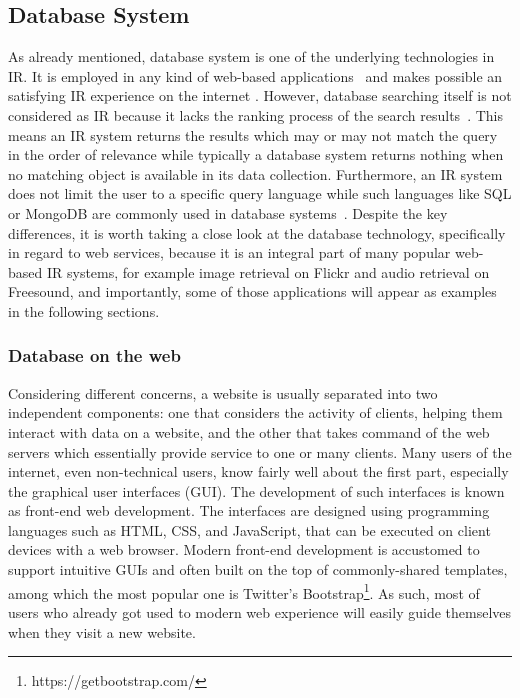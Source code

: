 \subsection{Database System}
As already mentioned, database system is one of the underlying technologies in IR.  It is employed in any kind of web-based applications~\cite{williams2004} and makes possible an satisfying IR experience on the internet . However, database searching itself is not considered as IR because it lacks the ranking process of the search results~\cite{jansen2010}. This means an IR system returns the results which may or may not match the query in the order of relevance while typically a database system returns nothing when no matching object is available in its data collection. Furthermore, an IR system does not limit the user to a specific query language while such languages like SQL or MongoDB are commonly used in database systems~\cite{karan2017}.
Despite the key differences, it is worth taking a close look at the database technology, specifically in regard to web services, because it is an integral part of many popular web-based IR systems, for example image retrieval on Flickr and audio retrieval on Freesound, and importantly, some of those applications will appear as examples in the following sections. 

\subsubsection{Database on the web}\label{DBonWeb}
Considering different concerns, a website is usually separated into two independent components: one that considers the activity of clients, helping them interact with data on a website, and the other that takes command of the web servers which essentially provide service to one or many clients. Many users of the internet, even non-technical users, know fairly well about the first part, especially the graphical user interfaces (GUI). The development of such interfaces is known as front-end web development. The interfaces are designed using programming languages such as HTML, CSS, and JavaScript, that can be executed on client devices with a web browser. Modern front-end development is accustomed to support intuitive GUIs and often built on the top of commonly-shared templates, among which the most popular one is Twitter's Bootstrap\footnote{https://getbootstrap.com/}. As such, most of users who already got used to modern web experience will easily guide themselves when they visit a new website.


